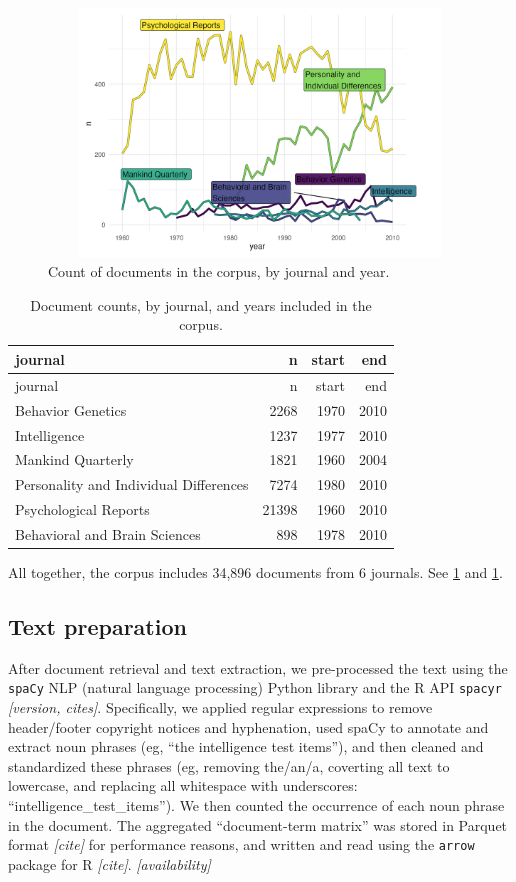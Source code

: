 \documentclass[12pt]{article}
\begin{document}
\begin{figure}
\centering
\includegraphics[width=4.76in,height=2.6in]{img/02_count.png}
\caption{Count of documents in the corpus, by journal and year. \label{fig:counts}}
\end{figure}

\begin{longtable}[]{@{}lrrr@{}}
\caption{\label{tab:counts} Document counts, by journal, and years included in the corpus.}\tabularnewline
\toprule
journal & n & start & end \\
\midrule
\endfirsthead
\toprule
journal & n & start & end \\
\midrule
\endhead
Behavior Genetics & 2268 & 1970 & 2010 \\
Intelligence & 1237 & 1977 & 2010 \\
Mankind Quarterly & 1821 & 1960 & 2004 \\
Personality and Individual Differences & 7274 & 1980 & 2010 \\
Psychological Reports & 21398 & 1960 & 2010 \\
Behavioral and Brain Sciences & 898 & 1978 & 2010 \\
\bottomrule
\end{longtable}

All together, the corpus includes 34,896 documents from 6 journals. See \ref{fig:counts} and \ref{tab:counts}.

\hypertarget{text-preparation}{%
\subsection*{Text preparation}\label{text-preparation}}

After document retrieval and text extraction, we pre-processed the text using the \texttt{spaCy} NLP (natural language processing) Python library and the R API \texttt{spacyr} \emph{{[}version, cites{]}}. Specifically, we applied regular expressions to remove header/footer copyright notices and hyphenation, used spaCy to annotate and extract noun phrases (eg, ``the intelligence test items''), and then cleaned and standardized these phrases (eg, removing the/an/a, coverting all text to lowercase, and replacing all whitespace with underscores: ``intelligence\_test\_items''). We then counted the occurrence of each noun phrase in the document. The aggregated ``document-term matrix'' was stored in Parquet format \emph{{[}cite{]}} for performance reasons, and written and read using the \texttt{arrow} package for R \emph{{[}cite{]}}. \emph{{[}availability{]}}
\end{document}
